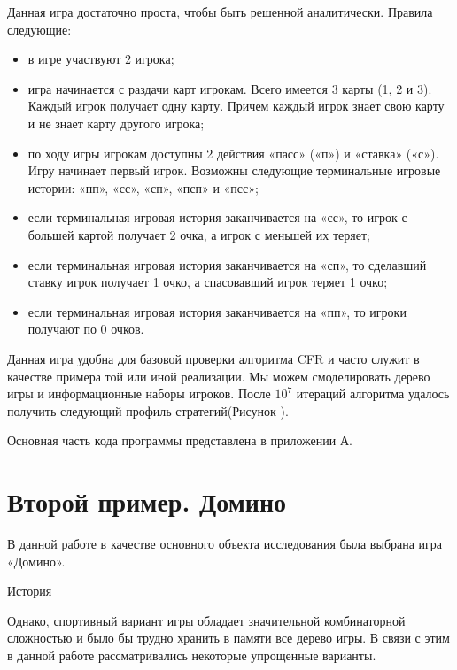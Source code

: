 Данная игра достаточно проста, чтобы быть решенной аналитически. Правила следующие:
\begin{itemize}
	\item в игре участвуют 2 игрока;
	\item игра начинается с раздачи карт игрокам. Всего имеется 3 карты (1, 2 и 3). Каждый игрок получает одну карту. Причем каждый игрок знает свою карту и не знает карту другого игрока;
	\item по ходу игры игрокам доступны 2 действия «пасс» («п») и «ставка» («с»). Игру начинает первый игрок. Возможны следующие терминальные игровые истории: «пп», «сс», «сп», «псп» и «псс»;
	\item если терминальная игровая история заканчивается на «сс», то игрок с большей картой получает 2 очка, а игрок с меньшей их теряет;
	\item если терминальная игровая история заканчивается на «сп», то сделавший ставку игрок получает 1 очко, а спасовавший игрок теряет 1 очко;
	\item если терминальная игровая история заканчивается на «пп», то игроки получают по 0 очков.
\end{itemize}
Данная игра удобна для базовой проверки алгоритма CFR и часто служит в качестве примера той или иной реализации. Мы можем смоделировать дерево игры и информационные наборы игроков. После $10^7$ итераций алгоритма удалось получить следующий профиль стратегий(Рисунок ).

Основная часть кода программы представлена в приложении А.

\section{Второй пример. Домино}

В данной работе в качестве основного объекта исследования была выбрана игра «Домино».

История

Однако, спортивный вариант игры обладает значительной комбинаторной сложностью и было бы трудно хранить в памяти все дерево игры. В связи с этим в данной работе рассматривались некоторые упрощенные варианты.

